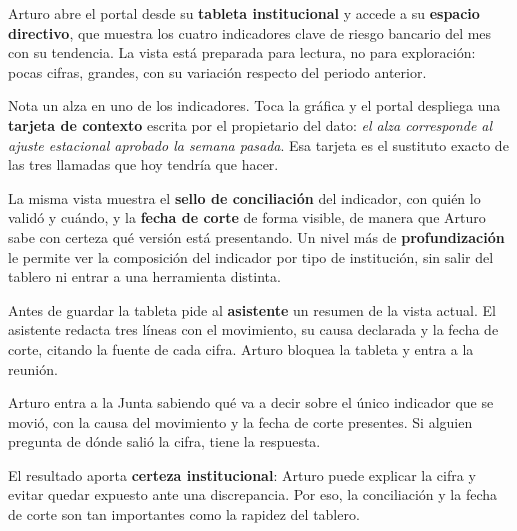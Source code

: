 Arturo abre el portal desde su \textbf{tableta institucional} y accede a su \textbf{espacio
directivo}, que muestra los cuatro indicadores clave de riesgo bancario del mes con su
tendencia. La vista está preparada para lectura, no para exploración: pocas cifras, grandes,
con su variación respecto del periodo anterior.

Nota un alza en uno de los indicadores. Toca la gráfica y el portal despliega una
\textbf{tarjeta de contexto} escrita por el propietario del dato: \emph{el alza corresponde al
ajuste estacional aprobado la semana pasada}. Esa tarjeta es el sustituto exacto de las tres
llamadas que hoy tendría que hacer.

La misma vista muestra el \textbf{sello de conciliación} del indicador, con quién lo validó y
cuándo, y la \textbf{fecha de corte} de forma visible, de manera que Arturo sabe con certeza
qué versión está presentando. Un nivel más de \textbf{profundización} le permite ver la
composición del indicador por tipo de institución, sin salir del tablero ni entrar a una
herramienta distinta.

Antes de guardar la tableta pide al \textbf{asistente} un resumen de la vista actual. El
asistente redacta tres líneas con el movimiento, su causa declarada y la fecha de corte,
citando la fuente de cada cifra. Arturo bloquea la tableta y entra a la reunión.


Arturo entra a la Junta sabiendo qué va a decir sobre el único indicador que se movió, con la
causa del movimiento y la fecha de corte presentes. Si alguien pregunta de dónde salió la
cifra, tiene la respuesta.

El resultado aporta \textbf{certeza institucional}: Arturo puede explicar la cifra y evitar
quedar expuesto ante una discrepancia. Por eso, la conciliación y la fecha de corte son tan
importantes como la rapidez del tablero.


\begin{uxlist}
\end{uxlist}

